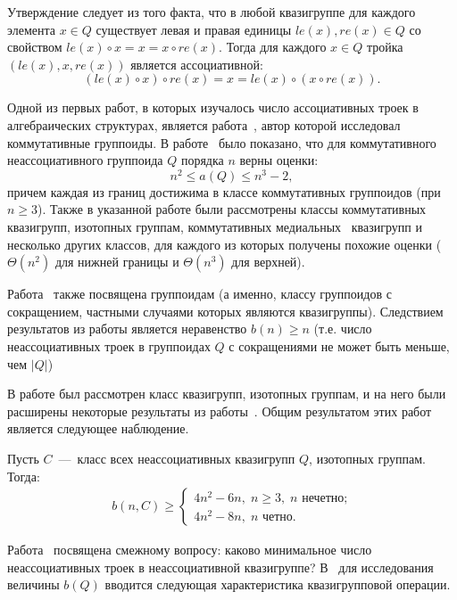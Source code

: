     Утверждение следует из того факта, что в любой квазигруппе для каждого элемента $x \in Q$ существует левая и правая единицы $le(x), re(x) \in Q$ со свойством $le(x) \circ x = x = x \circ re(x)$. 
    Тогда для каждого $x \in Q$ тройка $(le(x), x, re(x))$ является ассоциативной: 
    \[
        (le(x) \circ x) \circ re(x) 
        = x = le(x) \circ (x \circ re(x)).
    \] 

    Одной из первых работ, в которых изучалось число ассоциативных троек в алгебраических структурах, является работа~\cite{kepka1981notes}, автор которой исследовал коммутативные группоиды.
    В работе~\cite{kepka1981notes} было показано, что для коммутативного неассоциативного группоида $Q$ порядка $n$ верны оценки:
    \[
        n^2 \le a(Q) \le n^3 - 2,
    \]
    причем каждая из границ достижима в классе коммутативных группоидов (при $n \ge 3$).
    Также в указанной работе были рассмотрены классы коммутативных квазигрупп, изотопных группам, коммутативных медиальных~\cite[глава~2, определение~7]{belousov} квазигрупп и несколько других классов, для каждого из которых получены похожие оценки ($\Theta(n^2)$ для нижней границы и $\Theta(n^3)$ для верхней).

    Работа~\cite{kepka1980note} также посвящена группоидам (а именно, классу группоидов с сокращением, частными случаями
    которых являются квазигруппы).
    Следствием результатов из работы \cite{kepka1980note} является неравенство $b(n) \ge n$ (т.е. число неассоциативных троек в группоидах $Q$ с сокращениями не может быть меньше, чем $\lvert Q \rvert$)

    В работе \cite{drapal1981note} был рассмотрен класс квазигрупп, изотопных группам, и на него были расширены некоторые результаты из работы~\cite{kepka1981notes}.
    Общим результатом этих работ является следующее наблюдение.
    \begin{proposition}
        Пусть $C$~---~класс всех неассоциативных квазигрупп $Q$, изотопных группам.
        Тогда:
        \begin{gather*}
            b(n, C) \ge 
            \begin{cases}
                4n^2 - 6n, \; n \ge 3, \; n \text{ нечетно;} \\
                4n^2 - 8n, \; n \text{ четно.}
            \end{cases}
        \end{gather*}
    \end{proposition}

    Работа~\cite{drapal1983quasigroups} посвящена смежному вопросу: каково минимальное число неассоциативных троек в неассоциативной квазигруппе?
    В~\cite{drapal1983quasigroups} для исследования величины $b(Q)$ вводится следующая характеристика квазигрупповой операции.

